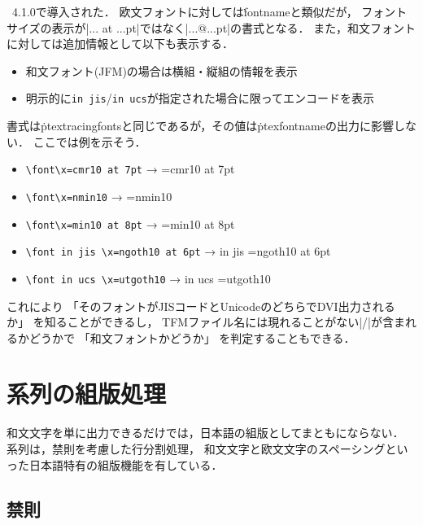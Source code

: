 \documentclass[a4paper,11pt,nomag,dvipdfmx]{jsarticle}
\begin{document}
\begin{cslist}
\csitem[\.{ptexfontname}]
  \pTeX~4.1.0で導入された．
  欧文フォントに対しては\.{fontname}と類似だが，
  フォントサイズの表示が|... at ...pt|ではなく|...@...pt|の書式となる．
  また，和文フォントに対しては追加情報として以下も表示する．
   \begin{itemize}
    \item 和文フォント(JFM)の場合は横組・縦組の情報を表示
    \item 明示的に\verb|in jis|/\verb|in ucs|が指定された場合に限ってエンコードを表示
   \end{itemize}
  書式は\.{ptextracingfonts}と同じであるが，その値は\.{ptexfontname}の出力に影響しない．
  ここでは例を示そう．
 \begin{itemize}
  \item \verb|\font\x=cmr10 at 7pt| → {\font\x=cmr10 at 7pt \code{\ptexfontname\x}}
  \item \verb|\font\x=nmin10| → {\font\x=nmin10 \code{\ptexfontname\x}}
  \item \verb|\font\x=min10 at 8pt| → {\font\x=min10 at 8pt \code{\ptexfontname\x}}
  \item \verb|\font in jis \x=ngoth10 at 6pt| → {\font in jis \x=ngoth10 at 6pt \code{\ptexfontname\x}}
  \item \verb|\font in ucs \x=utgoth10| → {\font in ucs \x=utgoth10 \code{\ptexfontname\x}}
 \end{itemize}
  これにより
  「そのフォントがJISコードとUnicodeのどちらでDVI出力されるか」
  を知ることができるし，
  TFMファイル名には現れることがない|/|が含まれるかどうかで
  「和文フォントかどうか」
  を判定することもできる．
\end{cslist}

\section{\pTeX 系列の組版処理}

和文文字を単に出力できるだけでは，日本語の組版としてまともにならない．
\pTeX 系列は，禁則を考慮した行分割処理，
和文文字と欧文文字のスペーシングといった日本語特有の組版機能を有している．

\subsection{禁則}
\label{sec:kinsoku}
\end{document}
